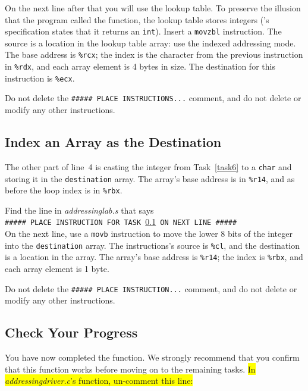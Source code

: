 On the next line after that you will use the  lookup table.
To preserve the illusion that the program called the 
function, the lookup table stores integers ('s specification
states that it returns an \lstinline{int}). Insert a \lstinline{movzbl}
instruction. The source is a location in the lookup table array: use the indexed
addressing mode. The base address is \lstinline{%rcx}; the index is the
character from the previous instruction in \lstinline{%rdx}, and each array
element is 4 bytes in size. The destination for this instruction is
\lstinline{%ecx}.


Do not delete the \texttt{\#\#\#\#\# PLACE INSTRUCTIONS...} comment, and do not
delete or modify any other instructions.

\subsection{Index an Array as the Destination}\label{task7}

The other part of line~4 is casting the integer from Task~\ref{task6} to a
\lstinline{char} and storing it in the \lstinline{destination} array. The
array's base address is in \lstinline{%r14}, and as before the loop index is in
\lstinline{%rbx}.

Find the line in \textit{addressinglab.s} that says \\
\texttt{\#\#\#\#\# PLACE INSTRUCTION FOR TASK \ref{task7} ON NEXT LINE \#\#\#\#\#} \\
On the next line, use a \lstinline{movb} instruction to move the lower 8 bits
of the integer into the \lstinline{destination} array. The instructions's
source is \lstinline{%cl}, and the destination is a location in the array. The
array's base address is \lstinline{%r14}; the index is \lstinline{%rbx}, and
each array element is 1 byte.


Do not delete the \texttt{\#\#\#\#\# PLACE INSTRUCTION...} comment, and do not
delete or modify any other instructions.

\subsection*{Check Your Progress}

You have now completed the  function. We
strongly recommend that you confirm that this function works before moving on
to the remaining tasks. \colorbox{yellow}{In \textit{addressingdriver.c}'s 
function, un-comment this line:}

